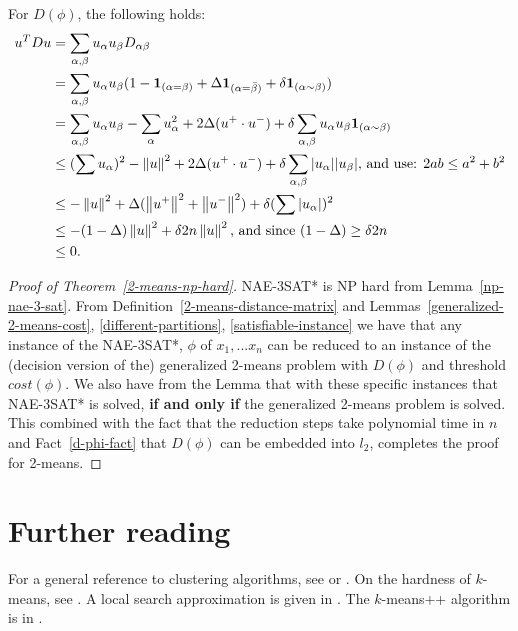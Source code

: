 \begin{fact} \label{d-phi-fact}
For $D(\phi)$, the following holds:
\begin{align*}
u^TDu &= \sum_{\alpha, \beta} u_\alpha u_\beta D_{\alpha \beta}\\ 
&=\sum_{\alpha, \beta} u_\alpha u_\beta (1 - \mathbf{1}_{(\alpha =
  \beta)} + \Delta\mathbf{1}_{(\alpha = \bar{\beta})} + \delta
\mathbf{1}_{(\alpha \sim \beta)})\\ 
&=\sum_{\alpha, \beta} u_\alpha u_\beta - \sum_{\alpha} u_\alpha^2
+2\Delta (u^+ \cdot u^-) + \delta \sum_{\alpha, \beta} u_\alpha
u_\beta \mathbf{1}_{(\alpha \sim \beta)}\\ 
& \le (\sum u_\alpha)^2  - \left\lVert u\right\rVert^2 + 2\Delta (u^+ \cdot u^-) +
\delta \sum_{\alpha, \beta} |u_\alpha| |u_\beta| \text{,  and use:
  $2ab \le a^2 + b^2$}\\  
& \le - \left\lVert u\right\rVert^2 + \Delta (\left\lVert u^+\right\rVert^2  + \left\lVert u^-\right\rVert^2) + \delta
(\sum |u_\alpha|)^2 \\ 
& \le -(1- \Delta) \left\lVert u\right\rVert^2  + \delta 2n \left\lVert u\right\rVert^2  \text{,  and
  since $(1- \Delta) \ge \delta 2n$} \\ 
& \le 0.
\end{align*}
\end{fact}


\begin{proof}[Proof of Theorem~\ref{2-means-np-hard}]
NAE-3SAT* is NP hard from Lemma~\ref{np-nae-3-sat}.  From
Definition~\ref{2-means-distance-matrix} and
Lemmas~\ref{generalized-2-means-cost}, \ref{different-partitions},
\ref{satisfiable-instance} we have that any instance of the NAE-3SAT*,
$\phi$ of $x_1,...x_n$ can be reduced to an instance of the (decision
version of the) generalized 2-means problem with $D(\phi)$ and
threshold $cost(\phi)$.  We also have from the Lemma that with these
specific instances that NAE-3SAT* is solved, \textbf{if and only if}
the generalized 2-means problem is solved.  This combined with the
fact that the reduction steps take polynomial time in $n$ and
Fact~\ref{d-phi-fact} that $D(\phi)$ can be embedded into $l_2$,
completes the proof for 2-means. 
\end{proof}





\section{Further reading}
For a general reference to clustering algorithms, see \cite{har75}
or \cite{gon85}. On the hardness of $k$-means, see \cite{das2008}.
A local search approximation is given in \cite{kan2004}. The 
$k$-means++ algorithm is in \cite{art2007}.
